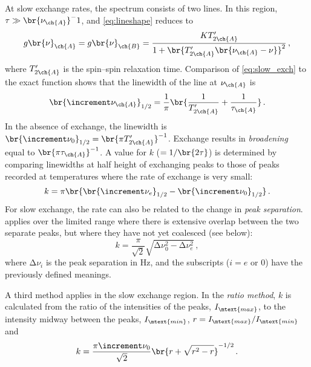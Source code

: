 \documentclass[nobib,nofonts,nols,nohyper]{tufte-handout}
\begin{document}
At slow exchange rates, the spectrum consists of two lines. 
In this region, \( \tau \gg \br{\nu_\ch{A}}^-1 \), and \cref{eq:lineshape} reduces to 
\begin{equation}
  g\br{\nu}_{\ch{A}} = g\br{\nu}_{\ch{B}} = \frac{K T'_{2\ch{A}}}{1 + \br{T'_{2\ch{A}} \br{\nu_{\ch{A}} - \nu}}^2} \, ,
  \label{eq:slow_exch_peak}
\end{equation}
where \( T'_{2\ch{A}} \) is the spin--spin relaxation time. 
Comparison of \cref{eq:slow_exch} to the exact function shows that the linewidth of the line at \( \nu_{\ch{A}} \) is
\begin{equation}
  \br{\increment \nu_\ch{A}}_{1/2} = \frac{1}{\pi} \br{\frac{1}{T'_{2\ch{A}}} + \frac{1}{\tau_\ch{A}}} \, .
  \label{eq:slow_exch_width}
\end{equation}
In the absence of exchange, the linewidth is \( \br{\increment \nu_0}_{1/2} = \br{\pi T'_{2\ch{A}}}^{-1} \). 
Exchange results in \emph{broadening} equal to \( \br{\pi \tau_\ch{A}}^{-1} \). 
A value for \( k \) (\( =1/\br{2\tau} \)) is determined by comparing linewidths at half height of exchanging peaks to those of peaks recorded at temperatures where the rate of exchange is very small:
\begin{equation}
  k = \pi \br{\br{\increment \nu_e}_{1/2} - \br{\increment \nu_0}_{1/2}} \, .
  \label{eq:slow_exch_k_1}
\end{equation}
For slow exchange, the rate can also be related to the change in \emph{peak separation}. 
 applies over the limited range where there is extensive overlap between the two separate peaks, but where they have not yet coalesced (see below):
\begin{equation}
  k = \frac{\pi}{\sqrt{2}} \sqrt{\increment \nu_0^2 - \increment \nu_e^2} \, ,
  \label{eq:slow_exch_k_2}
\end{equation}
where \( \increment\nu_i \) is the peak separation in \unit{\Hz}, and the subscripts (\( i = e \) or \num{0}) have the previously defined meanings.

A third method applies in the slow exchange region. 
In the \emph{ratio method}, \( k \) is calculated from the ratio of the intensities of the peaks, \( I_\mtext{max} \), to the intensity midway between the peaks, \( I_\mtext{min} \), \( r = I_\mtext{max} / I_\mtext{min} \) and 
\begin{equation}
  k = \frac{\pi \increment \nu_0}{\sqrt{2}} \br{ r + \sqrt{ r^2 - r}}^{-1/2} \, .
  \label{eq:slow_exch_k_3}
\end{equation}
\end{document}
